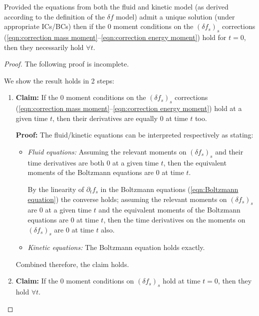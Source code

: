     \begin{conjecture}\label{con:delta f correction moments}
        Provided the equations from both the fluid and kinetic model (as derived according to the definition of the $\delta\! f$ model) admit a unique solution (under appropriate ICs/BCs) then if the 0 moment conditions on the $(\delta\!f_{s})_{s}$ corrections (\ref{eqn:correction mass moment}--\ref{eqn:correction energy moment}) hold for $t  =  0$, then they necessarily hold $\forall t$.
    \end{conjecture}
    \begin{proof}
        The following proof is incomplete.
        
        We show the result holds in 2 steps:
        \begin{enumerate}
            \item  {\bf Claim:} If the 0 moment conditions on the $(\delta\!f_{s})_{s}$ corrections (\ref{eqn:correction mass moment}--\ref{eqn:correction energy moment}) hold at a given time $t$, then their derivatives are equally 0 at time $t$ too.
            
            {\bf Proof:} The fluid/kinetic equations can be interpreted respectively as stating:
            \begin{itemize}
                \item  \emph{Fluid equations:} Assuming the relevant moments on $(\delta\!f_{s})_{s}$ and their time derivatives are both 0 at a given time $t$, then the equivalent moments of the Boltzmann equations are 0 at time $t$.

                By the linearity of $\partial_{t}f_{s}$ in the Boltzmann equations (\ref{eqn:Boltzmann equation}) the converse holds; assuming the relevant moments on $(\delta\!f_{s})_{s}$ are 0 at a given time $t$ and the equivalent moments of the Boltzmann equations are 0 at time $t$, then the time derivatives on the moments on $(\delta\!f_{s})_{s}$ are 0 at time $t$ also.
                
                \item  \emph{Kinetic equations:} The Boltzmann equation holds exactly.
            \end{itemize}
            Combined therefore, the claim holds.

            \item  {\bf Claim:} If the 0 moment conditions on $(\delta\!f_{s})_{s}$ hold at time $t  =  0$, then they hold $\forall t$.
            

\end{enumerate}
\end{proof}
